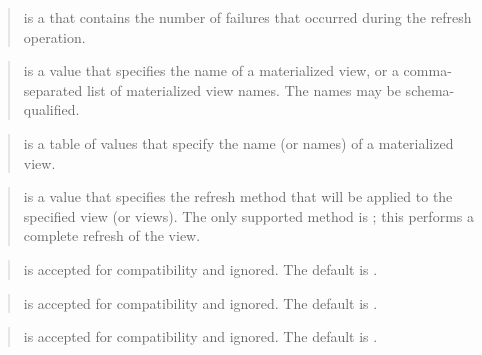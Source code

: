 \documentclass[letterpaper,10pt,english,openany,oneside]{sphinxmanual}
\begin{document}
\begin{quote}

 is a  that contains the number
of failures that occurred during the refresh operation.
\end{quote}

\begin{quote}

 is a  value that specifies the name of a materialized
view, or a comma-separated list of materialized view names. The
names may be schema-qualified.
\end{quote}

\begin{quote}

 is a table of  values that specify
the name (or names) of a materialized view.
\end{quote}

\begin{quote}

 is a  value that specifies the refresh method that
will be applied to the specified view (or views). The only supported
method is ; this performs a complete refresh of the view.
\end{quote}

\begin{quote}

 is accepted for compatibility and ignored. The
default is .
\end{quote}

\begin{quote}

 is accepted for compatibility and ignored.
The default is .
\end{quote}

\begin{quote}

 is accepted for compatibility and ignored. The
default is .
\end{quote}
\end{document}
